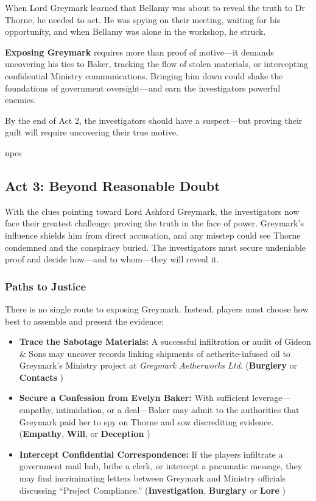 When Lord Greymark learned that Bellamy was about to reveal the truth to Dr Thorne, he needed to act. He was spying on their meeting, waiting for his opportunity, and when Bellamy was alone in the workshop, he struck. 

\textbf{Exposing Greymark} requires more than proof of motive—it demands uncovering his ties to Baker, tracking the flow of stolen materials, or intercepting confidential Ministry communications. Bringing him down could shake the foundations of government oversight—and earn the investigators powerful enemies.


\vspace{\baselineskip}\noindent
By the end of Act 2, the investigators should have a suspect—but proving their guilt will require uncovering their true motive.


{npcs}


\subsection{Act 3: Beyond Reasonable Doubt}
With the clues pointing toward Lord Ashford Greymark, the investigators now face their greatest challenge: proving the truth in the face of power. Greymark’s influence shields him from direct accusation, and any misstep could see Thorne condemned and the conspiracy buried. The investigators must secure undeniable proof and decide how—and to whom—they will reveal it.

\subsubsection*{Paths to Justice}
There is no single route to exposing Greymark. Instead, players must choose how best to assemble and present the evidence:

\begin{itemize}
    \item \textbf{Trace the Sabotage Materials:} A successful infiltration or audit of Gideon \& Sons may uncover records linking shipments of aetherite-infused oil to Greymark’s Ministry project at \emph{Greymark Aetherworks Ltd}. (\textbf{Burglery} or \textbf{Contacts} )
    
    \item \textbf{Secure a Confession from Evelyn Baker:} With sufficient leverage—empathy, intimidation, or a deal—Baker may admit to the authorities that Greymark paid her to spy on Thorne and sow discrediting evidence. (\textbf{Empathy}, \textbf{Will}, or \textbf{Deception} )

    \item \textbf{Intercept Confidential Correspondence:} If the players infiltrate a government mail hub, bribe a clerk, or intercept a pneumatic message, they may find incriminating letters between Greymark and Ministry officials discussing “Project Compliance.” (\textbf{Investigation}, \textbf{Burglary} or \textbf{Lore} )
\end{itemize}


